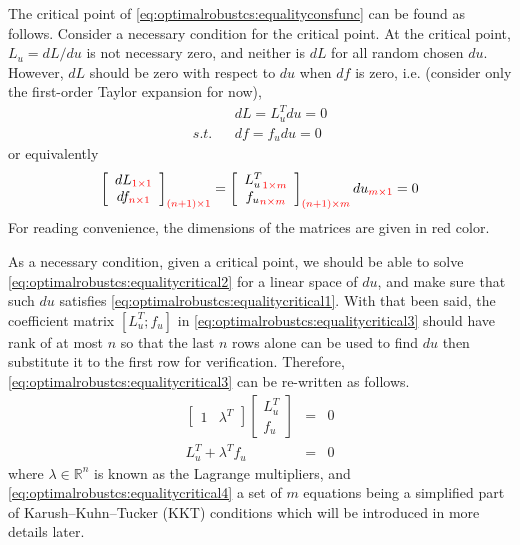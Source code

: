 The critical point of \eqref{eq:optimalrobustcs:equalityconsfunc} can be found as follows. Consider a necessary condition for the critical point. At the critical point, $L_u = dL / du$ is not necessary zero, and neither is $dL$ for all random chosen $du$. However, $dL$ should be zero with respect to $du$ when $df$ is zero, i.e. (consider only the first-order Taylor expansion for now),
\begin{eqnarray}
	&& dL = L_u^Tdu = 0 \label{eq:optimalrobustcs:equalitycritical1} \\
	\textit{s.t.} && df = f_udu = 0 \label{eq:optimalrobustcs:equalitycritical2}
\end{eqnarray}
or equivalently
\begin{eqnarray}
	\left[\begin{array}{c}
		dL_{\color{red} 1\times 1} \\ df_{\color{red} n\times 1}
	\end{array}\right]_{\color{red} (n+1)\times 1} = \left[\begin{array}{c}
	{L_u^T}_{\color{red} 1\times m} \\ {f_u}_{\color{red} n\times m} 
	\end{array}\right]_{\color{red} (n+1)\times m}du_{\color{red} m\times 1} = 0 \label{eq:optimalrobustcs:equalitycritical3}
\end{eqnarray}
For reading convenience, the dimensions of the matrices are given in red color.

As a necessary condition, given a critical point, we should be able to solve \eqref{eq:optimalrobustcs:equalitycritical2} for a linear space of $du$, and make sure that such $du$ satisfies \eqref{eq:optimalrobustcs:equalitycritical1}. With that been said, the coefficient matrix $[L_u^T; f_u]$ in \eqref{eq:optimalrobustcs:equalitycritical3} should have rank of at most $n$ so that the last $n$ rows alone can be used to find $du$ then substitute it to the first row for verification. Therefore, \eqref{eq:optimalrobustcs:equalitycritical3} can be re-written as follows.
\begin{eqnarray}
	\left[\begin{array}{cc}
		1 & \lambda^T
	\end{array}\right] \left[\begin{array}{c}
	L_u^T \\ f_u
	\end{array}\right] &=& 0 \nonumber \\
	L_u^T + \lambda^Tf_u &=& 0 \label{eq:optimalrobustcs:equalitycritical4}
\end{eqnarray}
where $\lambda \in \mathbb{R}^n$ is known as the Lagrange multipliers, and \eqref{eq:optimalrobustcs:equalitycritical4} a set of $m$ equations being a simplified part of Karush–Kuhn–Tucker (KKT) conditions which will be introduced in more details later.

